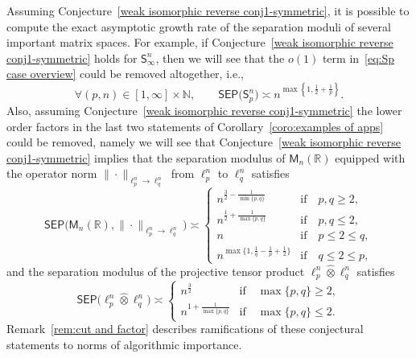 \documentclass[11pt,reqno]{amsart}
\renewcommand{\le}{\leqslant}
\renewcommand{\ge}{\geqslant}
\renewcommand{\setminus}{\smallsetminus}
\newcommand{\R}{\mathbb R}
\theoremstyle{remark}
\newcommand{\M}{\mathsf{M}}
\newcommand{\sfS}{\mathsf{S}}
\newcommand{\N}{\mathbb N}
\renewcommand{\1}{\mathbf 1}
\newcommand{\sep}{\mathsf{SEP}}
\newcommand{\tp}{\hat{\otimes}}
\begin{document}
Assuming Conjecture~\ref{weak isomorphic reverse conj1-symmetric}, it is possible to compute the exact asymptotic growth rate of the  separation moduli of several important matrix spaces. For example,  if  Conjecture~\ref{weak isomorphic reverse conj1-symmetric} holds for $\sfS_\infty^n$, then  we will see that the $o(1)$ term in~\eqref{eq:Sp case overview} could be removed altogether, i.e.,
\begin{equation}\label{eq:sharp lp sep assuming cojecture}
\forall (p,n)\in [1,\infty]\times \N,\qquad \sep\big(\sfS_p^n\big)\asymp n^{\max\left\{1,\frac12+\frac{1}{p}\right\}}.
\end{equation}
Also, assuming Conjecture~\ref{weak isomorphic reverse conj1-symmetric} the lower order factors in the last two statements of Corollary~\ref{coro:examples of apps} could be removed, namely we will see that Conjecture~\ref{weak isomorphic reverse conj1-symmetric}  implies that the separation modulus of $\M_n(\R)$ equipped with the operator norm $\|\cdot\|_{\ell_p^n\to \ell_q^n}$ from $\ell_p^n$ to $\ell_q^n$ satisfies
\begin{equation}\label{eq:sep of operator from ellp to ellq}
\sep\big(\M_n(\R),\|\cdot\|_{\ell_p^n\to \ell_q^n} \big)\asymp  \left\{ \begin{array}{ll}
n^{\frac32-\frac{1}{\min\{p,q\}}} &\mathrm{if}\quad  p,q\ge 2,\\
n^{\frac12+\frac{1}{\max\{p,q\}}} &\mathrm{if}\quad  p,q\le 2,\\
n& \mathrm{if}\quad  p\le 2\le q,\\
n^{\max\big\{1,\frac{1}{q}-\frac{1}{p}+\frac12\big\}} &\mathrm{if}\quad  q\le 2\le p,
  \end{array} \right.
\end{equation}
and the separation modulus of  the projective tensor product $\ell_p^n\tp \ell_q^n$ satisfies
\begin{equation}\label{eq:projective in overview}
\sep\big(\ell_p^n\tp \ell_q^n \big)\asymp \left\{ \begin{array}{ll} n^{\frac32} &\mathrm{if}\quad  \max\{p,q\}\ge 2,\\ n^{1+\frac{1}{\max\{p,q\}}} & \mathrm{if}\quad  \max\{p,q\}\le 2.
  \end{array} \right.
\end{equation}
Remark~\ref{rem:cut and factor} describes  ramifications of these conjectural statements to norms of algorithmic importance.
\end{document}

